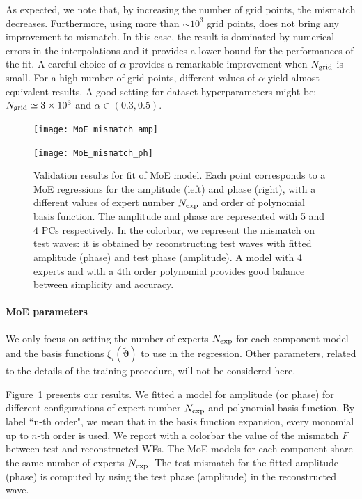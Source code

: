 As expected, we note that, by increasing the number of grid points, the mismatch decreases. Furthermore, using more than $\sim 10^3$ grid points, does not bring any improvement to mismatch. In this case, the result is dominated by numerical errors in the interpolations and it provides a lower-bound for the performances of the fit.
A careful choice of $\alpha$ provides a remarkable improvement when $N_{\rm grid}$ is small. For a high number of grid points, different values of $\alpha$ yield almost equivalent results.
A good setting for dataset hyperparameters might be: $N_{\rm grid} \simeq 3 \times 10^{3}$ and $\alpha \in (0.3,0.5)$.
\begin{figure}[!t]
	\centering
    \begin{minipage}{.5\linewidth}
        \centering
        \texttt{[image: MoE\_mismatch\_amp]}
    \end{minipage}\hfill
    \begin{minipage}{.5\linewidth}
        \centering
        \texttt{[image: MoE\_mismatch\_ph]}
    \end{minipage}
	\caption{Validation results for fit of MoE model. Each point corresponds to a MoE regressions for the amplitude (left) and phase (right), with a different values of expert number $N_{\rm exp}$ and order of polynomial basis function.
The amplitude and phase are represented with 5 and 4 PCs respectively.
In the colorbar, we represent the mismatch on test waves: it is obtained by reconstructing test waves with fitted amplitude (phase) and test phase (amplitude).
A model with 4 experts and with a 4th order polynomial provides good balance between simplicity and accuracy.
}
	\label{fig:MoE_test}
\end{figure}


\paragraph{MoE parameters}
We only focus on setting the number of experts $N_{\rm exp}$ for each component model and the basis functions $\xi_i(\boldsymbol{\tilde{\vartheta}})$ to use in the regression. Other parameters, related to the details of the training procedure, will not be considered here.

Figure~\ref{fig:MoE_test} presents our results.
We fitted a model for amplitude (or phase) for different configurations of expert number $N_{\rm exp}$ and polynomial basis function.
By label ``n-th order", we mean that in the basis function expansion, every monomial up to $n$-th order is used.
We report with a colorbar the value of the mismatch $F$ between test and reconstructed WFs. The MoE models for each 
component share the same number of experts $N_{\rm exp}$.
The test mismatch for the fitted amplitude (phase) is computed by using the test phase (amplitude) in the reconstructed wave.

